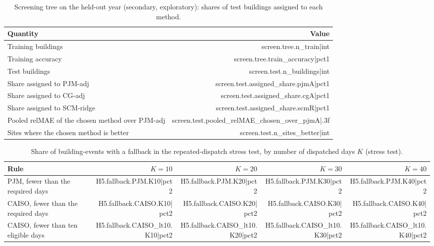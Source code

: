 \begin{table}[htbp]
\centering
\caption{Screening tree on the held-out year (secondary, exploratory): shares of test buildings assigned to each method.}\label{tabS:screen}
\small
\begin{tabular}{@{}lr@{}}
\toprule
Quantity & Value \\
\midrule
Training buildings & {{screen.tree.n_train|int}} \\
Training accuracy & {{screen.tree.train_accuracy|pct1}} \\
Test buildings & {{screen.test.n_buildings|int}} \\
Share assigned to PJM-adj & {{screen.test.assigned_share.pjmA|pct1}} \\
Share assigned to CG-adj & {{screen.test.assigned_share.cgA|pct1}} \\
Share assigned to SCM-ridge & {{screen.test.assigned_share.scmR|pct1}} \\
Pooled relMAE of the chosen method over PJM-adj & {{screen.test.pooled_relMAE_chosen_over_pjmA|.3f}} \\
Sites where the chosen method is better & {{screen.test.n_sites_better|int}} \\
\bottomrule
\end{tabular}
\par{}
\end{table}

\begin{table}[htbp]
\centering
\caption{Share of building-events with a fallback in the repeated-dispatch stress test, by number of dispatched days $K$ (stress test).}\label{tabS:fallback}
\small
\begin{tabular}{@{}lrrrr@{}}
\toprule
Rule & $K=10$ & $K=20$ & $K=30$ & $K=40$ \\
\midrule
PJM, fewer than the required days & {{H5.fallback.PJM.K10|pct2}} & {{H5.fallback.PJM.K20|pct2}} & {{H5.fallback.PJM.K30|pct2}} & {{H5.fallback.PJM.K40|pct2}} \\
CAISO, fewer than the required days & {{H5.fallback.CAISO.K10|pct2}} & {{H5.fallback.CAISO.K20|pct2}} & {{H5.fallback.CAISO.K30|pct2}} & {{H5.fallback.CAISO.K40|pct2}} \\
CAISO, fewer than ten eligible days & {{H5.fallback.CAISO_lt10.K10|pct2}} & {{H5.fallback.CAISO_lt10.K20|pct2}} & {{H5.fallback.CAISO_lt10.K30|pct2}} & {{H5.fallback.CAISO_lt10.K40|pct2}} \\
\bottomrule
\end{tabular}
\par{}
\end{table}

